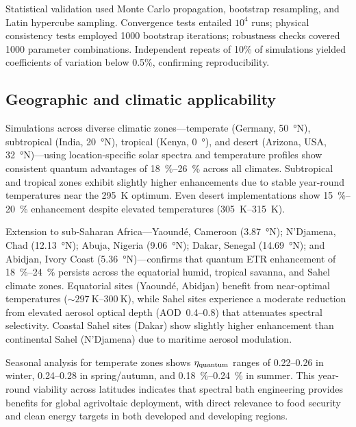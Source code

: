 Statistical validation used Monte Carlo propagation, bootstrap resampling, and Latin hypercube sampling. Convergence tests entailed $10^4$ runs; physical consistency tests employed 1000 bootstrap iterations; robustness checks covered 1000 parameter combinations. Independent repeats of 10\% of simulations yielded coefficients of variation below 0.5\%, confirming reproducibility.

\subsection{Geographic and climatic applicability}

Simulations across diverse climatic zones---temperate (Germany, \SI{50}{\degree}N), subtropical (India, \SI{20}{\degree}N), tropical (Kenya, \SI{0}{\degree}), and desert (Arizona, USA, \SI{32}{\degree}N)---using location-specific solar spectra and temperature profiles show consistent quantum advantages of \SIrange{18}{26}{\percent} across all climates. Subtropical and tropical zones exhibit slightly higher enhancements due to stable year-round temperatures near the \SI{295}{\kelvin} optimum. Even desert implementations show \SIrange{15}{20}{\percent} enhancement despite elevated temperatures (\SIrange{305}{315}{\kelvin}).

Extension to sub-Saharan Africa---Yaoundé, Cameroon (\SI{3.87}{\degree}N); N'Djamena, Chad (\SI{12.13}{\degree}N); Abuja, Nigeria (\SI{9.06}{\degree}N); Dakar, Senegal (\SI{14.69}{\degree}N); and Abidjan, Ivory Coast (\SI{5.36}{\degree}N)---confirms that quantum ETR enhancement of \SIrange{18}{24}{\percent} persists across the equatorial humid, tropical savanna, and Sahel climate zones. Equatorial sites (Yaound\'e, Abidjan) benefit from near-optimal temperatures ($\sim \SIrange{297}{300}{\kelvin}$), while Sahel sites experience a moderate reduction from elevated aerosol optical depth (AOD~\numrange{0.4}{0.8}) that attenuates spectral selectivity. Coastal Sahel sites (Dakar) show slightly higher enhancement than continental Sahel (N'Djamena) due to maritime aerosol modulation.

Seasonal analysis for temperate zones shows $\eta_{\rm quantum}$ ranges of \numrange{0.22}{0.26} in winter, \numrange{0.24}{0.28} in spring/autumn, and \SIrange{0.18}{0.24}{\percent} in summer. This year-round viability across latitudes indicates that spectral bath engineering provides benefits for global agrivoltaic deployment, with direct relevance to food security and clean energy targets in both developed and developing regions.
